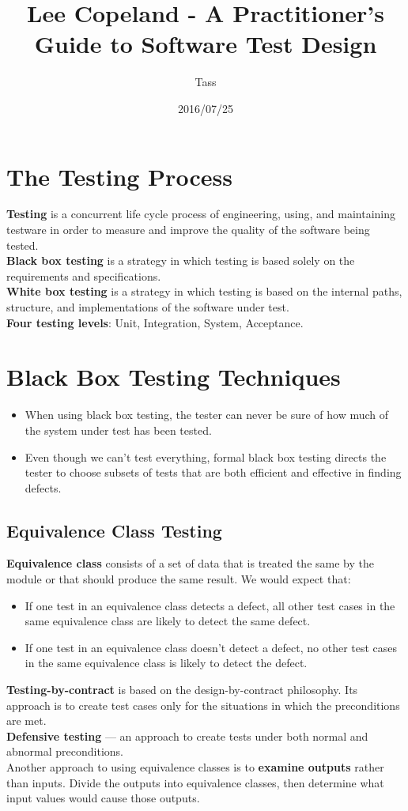 \documentclass{article}
\begin{document}
\title{Lee Copeland - A Practitioner's Guide to Software Test Design}
\author{Tass}
\date{2016/07/25}
\maketitle

\newpage
\section*{The Testing Process}
\textbf{Testing} is a concurrent life cycle process of engineering, using, and maintaining testware in order to measure and improve the quality of the software being tested.
\\
\textbf{Black box testing} is a strategy in which testing is based solely on the requirements and specifications.
\\
\textbf{White box testing} is a strategy in which testing is based on the internal paths, structure, and implementations of the software under test.
\\
\textbf{Four testing levels}: Unit, Integration, System, Acceptance.

\section*{Black Box Testing Techniques}
\begin{itemize}
\item When using black box testing, the tester can never be sure of how much of the system under test has been tested.
\item Even though we can't test everything, formal black box testing directs the tester to choose subsets of tests that are both efficient and effective in finding defects.
\end{itemize}

\subsection*{Equivalence Class Testing}
\textbf{Equivalence class} consists of a set of data that is treated the same by the module or that should produce the same result. We would expect that:
\begin{itemize}
\item If one test in an equivalence class detects a defect, all other test cases in the same equivalence class are likely to detect the same defect.
\item If one test in an equivalence class doesn't detect a defect, no other test cases in the same equivalence class is likely to detect the defect.
\end{itemize}
\textbf{Testing-by-contract} is based on the design-by-contract philosophy. Its approach is to create test cases only for the situations in which the preconditions are met.
\\
\textbf{Defensive testing} --- an approach to create tests under both normal and abnormal preconditions.
\\
Another approach to using equivalence classes is to \textbf{examine outputs} rather than inputs. Divide the outputs into equivalence classes, then determine what input values would cause those outputs.
\end{document}
